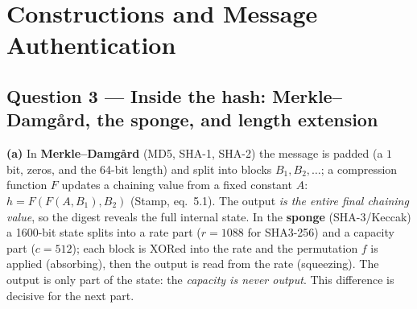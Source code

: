 \documentclass[11pt,a4paper]{article}
\begin{document}
\clearpage
\section*{Constructions and Message Authentication}

\subsection*{Question 3 --- Inside the hash: Merkle--Damg\aa rd, the sponge, and length extension}
\textbf{(a)} In \textbf{Merkle--Damg\aa rd} (MD5, SHA-1, SHA-2) the message is padded (a $1$ bit, zeros,
and the 64-bit length) and split into blocks $B_1,B_2,\dots$; a compression function $F$ updates a
chaining value from a fixed constant $A$: $h = F(F(A,B_1),B_2)$ (Stamp, eq.~5.1). The output \emph{is the
entire final chaining value}, so the digest reveals the full internal state. In the \textbf{sponge}
(SHA-3/Keccak) a 1600-bit state splits into a rate part ($r=1088$ for SHA3-256) and a capacity part
($c=512$); each block is XORed into the rate and the permutation $f$ is applied (absorbing), then the
output is read from the rate (squeezing). The output is only part of the state: the \emph{capacity is
never output}. This difference is decisive for the next part.
\end{document}

